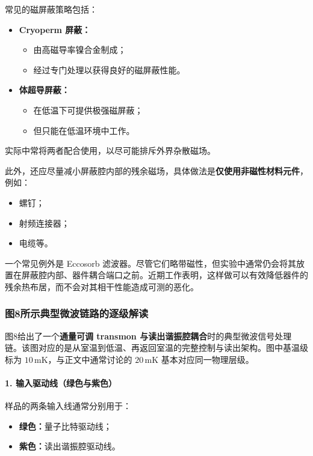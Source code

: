 \documentclass[12pt,a4paper,oneside]{ctexbook}
\begin{document}
常见的磁屏蔽策略包括：

\begin{itemize}
    \item \textbf{Cryoperm 屏蔽：}
    \begin{itemize}
        \item 由高磁导率镍合金制成；
        \item 经过专门处理以获得良好的磁屏蔽性能。
    \end{itemize}
    \item \textbf{体超导屏蔽：}
    \begin{itemize}
        \item 在低温下可提供极强磁屏蔽；
        \item 但只能在低温环境中工作。
    \end{itemize}
\end{itemize}

实际中常将两者配合使用，以尽可能排斥外界杂散磁场。

此外，还应尽量减小屏蔽腔内部的残余磁场，具体做法是\textbf{仅使用非磁性材料元件}，例如：

\begin{itemize}
    \item 螺钉；
    \item 射频连接器；
    \item 电缆等。
\end{itemize}

一个常见例外是 Eccosorb 滤波器。尽管它们略带磁性，但实验中通常仍会将其放置在屏蔽腔内部、器件耦合端口之前。近期工作表明，这样做可以有效降低器件的残余热布居，而不会对其相干性能造成可测的恶化。

\subsubsection{图8所示典型微波链路的逐级解读}

图8给出了一个\textbf{通量可调 transmon 与读出谐振腔耦合}时的典型微波信号处理链。该图对应的是从室温到低温、再返回室温的完整控制与读出架构。图中基温级标为 $10\,\mathrm{mK}$，与正文中通常讨论的 $20\,\mathrm{mK}$ 基本对应同一物理层级。

\paragraph{1. 输入驱动线（绿色与紫色）}

样品的两条输入线通常分别用于：

\begin{itemize}
    \item \textbf{绿色：}量子比特驱动线；
    \item \textbf{紫色：}读出谐振腔驱动线。
\end{itemize}
\end{document}
